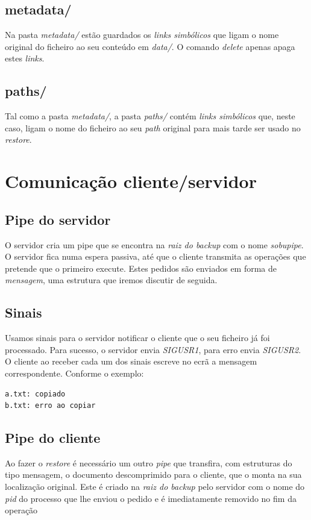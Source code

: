 \documentclass[12pt,a4paper]{report}
\begin{document}
\section{metadata/}
Na pasta \emph{metadata/} estão guardados os \emph{links simbólicos} que ligam o nome original do ficheiro ao seu conteúdo em \emph{data/}. O comando \emph{delete} apenas apaga estes \emph{links}.

\section{paths/}
Tal como a pasta \emph{metadata/}, a pasta \emph{paths/} contém \emph{links simbólicos} que, neste caso, ligam o nome do ficheiro ao seu \emph{path} original para mais tarde ser usado no \emph{restore}.

\chapter{Comunicação cliente/servidor}

\section{Pipe do servidor}
O servidor cria um pipe que se encontra na \emph{raiz do backup} com o nome \emph{sobupipe}. O servidor fica numa espera passiva, até que o cliente transmita as operações que pretende que o primeiro execute. Estes pedidos são enviados em forma de \emph{mensagem}, uma estrutura que iremos discutir de seguida.

\section{Sinais}
Usamos sinais para o servidor notificar o cliente que o seu ficheiro já foi processado. Para sucesso, o servidor envia \emph{SIGUSR1}, para erro envia \emph{SIGUSR2}. O cliente ao receber cada um dos sinais escreve no ecrã a mensagem correspondente. Conforme o exemplo:
\begin{lstlisting}
a.txt: copiado
b.txt: erro ao copiar
\end{lstlisting}

\section{Pipe do cliente}
Ao fazer o \emph{restore} é necessário um outro \emph{pipe} que transfira, com estruturas do tipo mensagem, o documento descomprimido para o cliente, que o monta na sua localização original. Este é criado na \emph{raiz do backup} pelo servidor com o nome do \emph{pid} do processo que lhe enviou o pedido e é imediatamente removido no fim da operação
\end{document}
